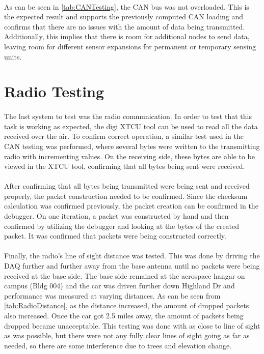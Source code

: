 \paragraph{}
As can be seen in \cref{tab:CANTesting}, the CAN bus was not overloaded.
This is the expected result and supports the previously computed CAN loading and confirms that there are no issues with the amount of data being transmitted.
Additionally, this implies that there is room for additional nodes to send data, leaving room for different sensor expansions for permanent or temporary sensing units.

\section{Radio Testing}

\paragraph{}
The last system to test was the radio communication.
In order to test that this task is working as expected, the digi XTCU tool can be used to read all the data received over the air.
To confirm correct operation, a similar test used in the CAN testing was performed, where several bytes were written to the transmitting radio with incrementing values.
On the receiving side, these bytes are able to be viewed in the XTCU tool, confirming that all bytes being sent were received.

\paragraph{}
After confirming that all bytes being transmitted were being sent and received properly, the packet construction needed to be confirmed.
Since the checksum calculation was confirmed previously, the packet creation can be confirmed in the debugger.
On one iteration, a packet was constructed by hand and then confirmed by utilizing the debugger and looking at the bytes of the created packet.
It was confirmed that packets were being constructed correctly.

\paragraph{}
Finally, the radio's line of sight distance was tested.
This was done by driving the DAQ further and further away from the base antenna until no packets were being received at the base side.
The base side remained at the aerospace hangar on campus (Bldg 004) and the car was driven further down Highland Dr and performance was measured at varying distances.
As can be seen from \cref{tab:RadioDistance}, as the distance increased, the amount of dropped packets also increased.  Once the car got 2.5 miles away, the amount of packets being dropped became unacceptable.
This testing was done with as close to line of sight as was possible, but there were not any fully clear lines of sight going as far as needed, so there are some interference due to trees and elevation change.

